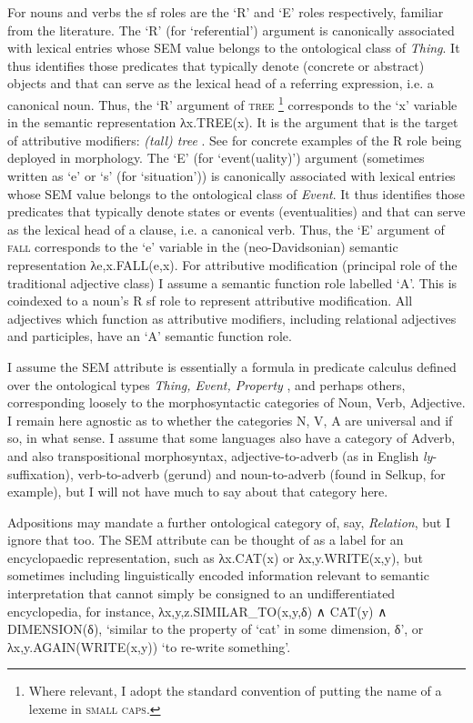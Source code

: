 \documentclass[output=paper,
modfonts
]{LSP/langsci}
\begin{document}
For nouns and verbs the sf roles are the ‘R’ and ‘E’ roles respectively, familiar from the literature. The ‘R’ (for ‘referential’) 
argument is canonically associated with lexical entries whose SEM value belongs to the ontological class of \textit{Thing}.
It thus identifies those predicates that typically denote (concrete or abstract) objects and that can serve as the lexical head of a referring expression, i.e. a canonical noun.  Thus, the ‘R’ argument of \textsc{tree}%
\footnote{Where relevant, I adopt the standard convention of putting the name of a lexeme in \textsc{small caps}.} %
 corresponds to the ‘x’ variable in the semantic representation λx.TREE(x). It is the argument that is the target of attributive modifiers: \emph{(tall) tree} \parencite{Spencer99:transpositions}.
See \textcite[16; 55]{Lieber04:book} for concrete examples of the R role being deployed in morphology.
The ‘E’ (for ‘event(uality)’) argument (sometimes written as ‘e’ or ‘s’ (for ‘situation’)) is canonically associated with lexical entries whose SEM value belongs to the ontological class of \textit{Event}. It thus identifies those predicates that typically denote states or events (eventualities)  and that can serve as the lexical head of a clause, i.e. a canonical verb.  Thus, the ‘E’ argument of \textsc{fall} corresponds to the ‘e’ variable in the (neo-Davidsonian) semantic representation λe,x.{FALL}(e,x). For attributive modification (principal role of the traditional adjective class) I assume a semantic function role labelled ‘A’. This is coindexed to a noun’s R sf role to represent attributive modification. All adjectives which function as attributive modifiers, including relational adjectives and participles, have an ‘A’ semantic function role.

I assume the SEM attribute is essentially a formula in predicate calculus defined over the ontological types \textit{Thing, Event, Property} \parencite{Jackendoff90}, %
and perhaps others, corresponding loosely to the morphosyntactic categories of Noun, Verb, Adjective. I remain here agnostic as to whether the categories N, V, A are universal and if so, in what sense. I assume that some languages also have a category of Adverb, and also transpositional morphosyntax, adjective-to-adverb (as in English \emph{ly}-suffixation), verb-to-adverb (gerund) and noun-to-adverb (found in Selkup, for example), but I will not have much to say about that category here.

\begin{sloppypar}Adpositions may mandate a further ontological category of, say, \textit{Relation}, but I ignore that too. The SEM attribute can be thought of as a label for an encyclopaedic representation, such as λx.CAT(x) or λx,y.WRITE(x,y), but sometimes including linguistically encoded information relevant to semantic interpretation that cannot simply be consigned to an undifferentiated encyclopedia, for instance, λx,y,z.SIMILAR\_TO(x,y,δ) ∧  CAT(y) ∧ DIMENSION(δ), ‘similar to the property of ‘cat’ in some dimension, δ’, or λx,y.AGAIN(WRITE(x,y)) `to re-write something’.\end{sloppypar}
\end{document}
